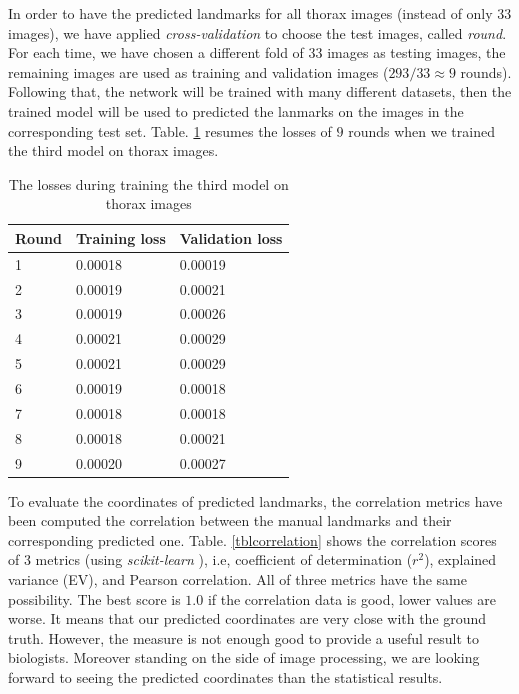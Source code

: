 In order to have the predicted landmarks for all thorax images (instead of only $33$ images), we have applied \textit{cross-validation} to choose the test images, called \textit{round}. For each time, we have chosen a different fold of $33$ images as testing images, the remaining images are used as training and validation images ($293/33 \approx 9$ rounds). Following that, the network will be trained with many different datasets, then the trained model will be used to predicted the lanmarks on the images in the corresponding test set. Table. \ref{tbltrainingloss} resumes the losses of $9$ rounds when we trained the third model on thorax images.

\begin{table}[h!]
	\centering
	\begin{tabular}{l l l}
	Round & Training loss & Validation loss \\ \hline
	1 & 0.00018 & 0.00019  \\ \hline
	2 & 0.00019 & 0.00021 \\ \hline
	3 & 0.00019 & 0.00026 \\ \hline
	4 & 0.00021 & 0.00029 \\ \hline
	5 & 0.00021 & 0.00029 \\ \hline
	6 & 0.00019 & 0.00018 \\ \hline
	7 & 0.00018 & 0.00018 \\ \hline
	8 & 0.00018 & 0.00021 \\ \hline
	9 & 0.00020 & 0.00027 \\ \hline
	\end{tabular}
	\caption{\small{The losses during training the third model on thorax images}}
	\label{tbltrainingloss}
\end{table}

To evaluate the coordinates of predicted landmarks, the correlation metrics have been computed the correlation between the manual landmarks and their corresponding predicted one. Table. \ref{tblcorrelation} shows the correlation scores of $3$ metrics (using \textit{scikit-learn} \cite{}), i.e, coefficient of determination ($r^2$), explained variance (EV), and Pearson correlation. All of three metrics have the same possibility. The best score is $1.0$ if the correlation data is good, lower values are worse. It means that our predicted coordinates are very close with the ground truth. However, the measure is not enough good to provide a useful result to biologists. Moreover standing on the side of image processing, we are looking forward to  seeing the predicted coordinates than the statistical results.

